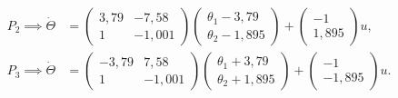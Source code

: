 \begin{itemize}
\begin{align*}
		P_2 \implies \dot{\Theta} &=
		\begin{pmatrix} 
			3,79 & -7,58 \\ 
			1 & -1,001
		\end{pmatrix}
		\begin{pmatrix}
			\theta_1 - 3,79 \\
			\theta_2 - 1,895
		\end{pmatrix}
		+
		\begin{pmatrix} -1 \\ 1,895 \end{pmatrix} u, \\
		P_3 \implies \dot{\Theta} &=
		\begin{pmatrix} 
			-3,79 & 7,58 \\ 
			1 & -1,001
		\end{pmatrix}
		\begin{pmatrix}
			\theta_1 + 3,79 \\
			\theta_2 + 1,895
		\end{pmatrix}
		+
		\begin{pmatrix} -1 \\ -1,895 \end{pmatrix} u.
	\end{align*}
\end{itemize}
%